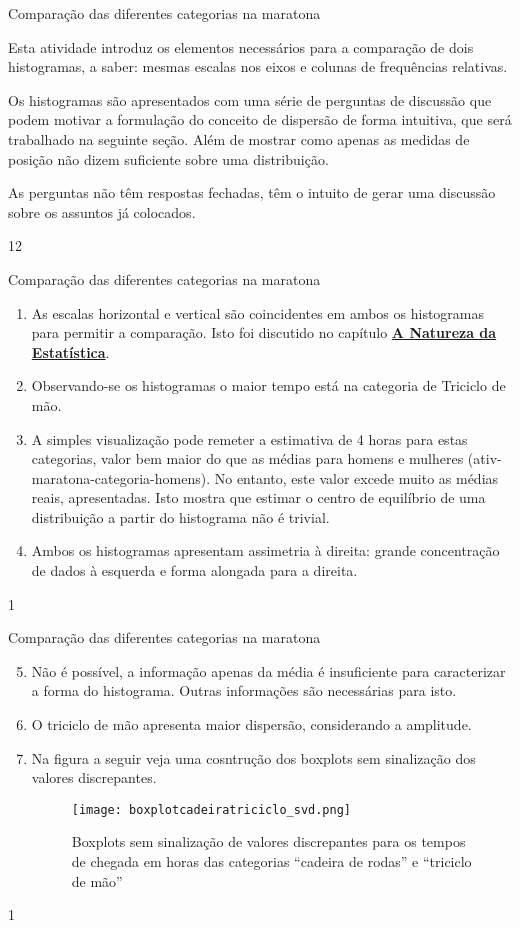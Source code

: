 \begin{sugestions}{Comparação das diferentes categorias na maratona}
{
Esta atividade introduz os elementos necessários para a comparação de dois histogramas, a saber: mesmas escalas nos eixos e colunas de frequências relativas.

Os histogramas são apresentados com uma série de perguntas de discussão que podem motivar a formulação do conceito de dispersão de forma intuitiva, que será trabalhado na seguinte seção. Além de mostrar como apenas as medidas de posição não dizem suficiente sobre uma distribuição.

As perguntas não têm respostas fechadas, têm o intuito de gerar uma discussão sobre os assuntos já colocados.
}{1}{2}
\end{sugestions}
\begin{answer}{Comparação das diferentes categorias na maratona}
{
\begin{enumerate}
\item As escalas horizontal e vertical são coincidentes em ambos os histogramas para permitir a comparação. Isto foi discutido no capítulo \hyperref[est1-chap]{\textbf{A Natureza da Estatística}}.
\item Observando-se os histogramas o maior tempo está na categoria de Triciclo de mão.
\item A simples visualização pode remeter a estimativa de 4 horas para estas categorias, valor bem maior do que as médias para homens e mulheres (ativ-maratona-categoria-homens). No entanto, este valor excede muito as médias reais, apresentadas. Isto mostra que estimar o centro de equilíbrio de uma distribuição a partir do histograma não é trivial.
\item Ambos os histogramas apresentam assimetria à direita: grande concentração de dados à esquerda e forma alongada para a direita.
\end{enumerate}
}{1}
\end{answer}
\clearmargin
\begin{answer}{Comparação das diferentes categorias na maratona}
{
\begin{enumerate}\setcounter{enumi}{4}
\item Não é possível, a informação apenas da média é insuficiente para caracterizar a forma do histograma. Outras informações são necessárias para isto.
\item O triciclo de mão apresenta maior dispersão, considerando a amplitude.
\item Na figura a seguir veja uma cosntrução dos boxplots sem sinalização dos valores discrepantes.
\begin{figure}[H]
\centering

\texttt{[image: boxplotcadeiratriciclo\_svd.png]}
\caption{Boxplots sem sinalização de valores discrepantes para os tempos de chegada em horas das categorias “cadeira de rodas”{} e “triciclo de mão”}

\end{figure}
\end{enumerate}
}{1}
\end{answer}

